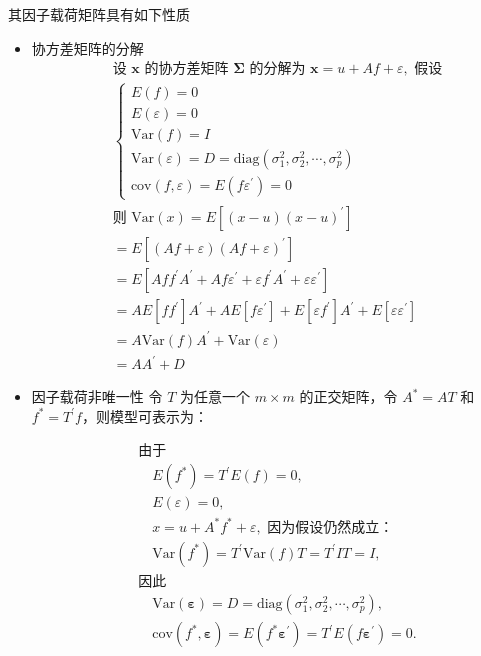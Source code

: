 \documentclass[12pt]{ctexart}
\numberwithin{equation}{section} %
\begin{document}
  其因子载荷矩阵具有如下性质
  \begin{itemize}
    \item 协方差矩阵的分解 $$\begin{aligned}
      &\text{设 } \boldsymbol{x} \text{ 的协方差矩阵 } \boldsymbol{\Sigma} \text{ 的分解为 } \boldsymbol{x} = u + A f + \varepsilon, \text{ 假设} \\
      &\begin{cases}
      E(f) = 0 \\
      E(\varepsilon) = 0 \\
      \text{Var}(f) = I \\
      \text{Var}(\varepsilon) = D = \text{diag}\left(\sigma_1^2, \sigma_2^2, \cdots, \sigma_p^2\right) \\
      \text{cov}(f, \varepsilon) = E(f \varepsilon^{\prime}) = 0
      \end{cases} \\
      &\text{则 } \text{Var}(x) = E[(x - u)(x - u)^{\prime}] \\
      &= E[(A f + \varepsilon)(A f + \varepsilon)^{\prime}] \\
      &= E[A f f^{\prime} A^{\prime} + A f \varepsilon^{\prime} + \varepsilon f^{\prime} A^{\prime} + \varepsilon \varepsilon^{\prime}] \\
      &= A E[f f^{\prime}] A^{\prime} + A E[f \varepsilon^{\prime}] + E[\varepsilon f^{\prime}] A^{\prime} + E[\varepsilon \varepsilon^{\prime}] \\
      &= A \text{Var}(f) A^{\prime} + \text{Var}(\varepsilon) \\
      &= A A^{\prime} + D
      \end{aligned}$$
      \item 因子载荷非唯一性 令 $T$ 为任意一个 $m \times m$ 的正交矩阵，令 $A^* = AT$ 和 $f^* = T^{\prime} f$，则模型可表示为：

      \[
      \begin{aligned}
      &\text{由于} \\
      &\quad E(f^*) = T^{\prime} E(f) = 0, \\
      &\quad E(\varepsilon) = 0, \\
      &\quad x = u + A^* f^* + \varepsilon, \text{ 因为假设仍然成立：} \\
      &\quad \text{Var}(f^*) = T^{\prime} \text{Var}(f) T = T^{\prime} I T = I, \\
      &\text{因此} \\
      &\quad \text{Var}(\boldsymbol{\varepsilon}) = D = \text{diag}(\sigma_1^2, \sigma_2^2, \cdots, \sigma_p^2), \\
      &\quad \text{cov}(f^*, \boldsymbol{\varepsilon}) = E(f^* \boldsymbol{\varepsilon}^{\prime}) = T^{\prime} E(f \boldsymbol{\varepsilon}^{\prime}) = 0.
      \end{aligned}
      \]
\end{itemize}
\end{document}
